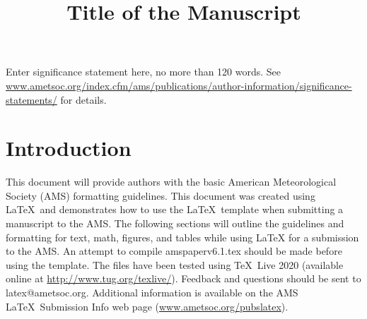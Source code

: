 \documentclass{ametsocV6.1}
\title{Title of the Manuscript}
\affiliation{\aff{a}{First Affiliation}\\
\aff{b}{Second Affiliation}\\
\aff{c}{Third Affiliation}\\
\aff{d}{Fourth Affiliation}
}
\begin{document}
\maketitle

%
%
%
\statement
	 Enter significance statement here, no more than 120 words. See \url{www.ametsoc.org/index.cfm/ams/publications/author-information/significance-statements/} for details.
%
%


%
\section{Introduction}

This document will provide authors with the basic American Meteorological
Society (AMS) formatting guidelines. This document was created using \LaTeX\
and demonstrates how to use the \LaTeX\ template when submitting a manuscript
to the AMS.  The following sections will outline the guidelines and
formatting for text, math, figures, and tables while using \LaTeX\/ for a
submission to the AMS. An attempt to compile amspaperv6.1.tex should be made
before using the template. The files have been tested using \TeX\ Live 2020 (available online at
\url{http://www.tug.org/texlive/}). Feedback and questions should be sent to
latex@ametsoc.org. Additional information is available on the AMS \LaTeX\ Submission Info
web page (\url{www.ametsoc.org/pubslatex}).
\end{document}
